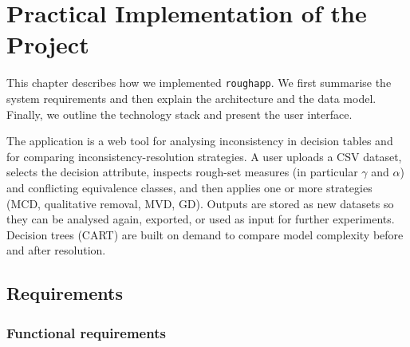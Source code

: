 \chapter{Practical Implementation of the Project}
\label{ch:implementation}


This chapter describes how we implemented \texttt{roughapp}. We first summarise
the system requirements and then explain the architecture and the data model.
Finally, we outline the technology stack and present the user interface.

The application is a web tool for analysing inconsistency in decision tables and
for comparing inconsistency-resolution strategies. A user uploads a CSV dataset,
selects the decision attribute, inspects rough-set measures (in particular
$\gamma$ and $\alpha$) and conflicting equivalence classes, and then applies one
or more strategies (MCD, qualitative removal, MVD, GD). Outputs are stored as
new datasets so they can be analysed again, exported, or used as input for
further experiments. Decision trees (CART) are built on demand to compare model
complexity before and after resolution.

\section{Requirements}

\subsection{Functional requirements}

